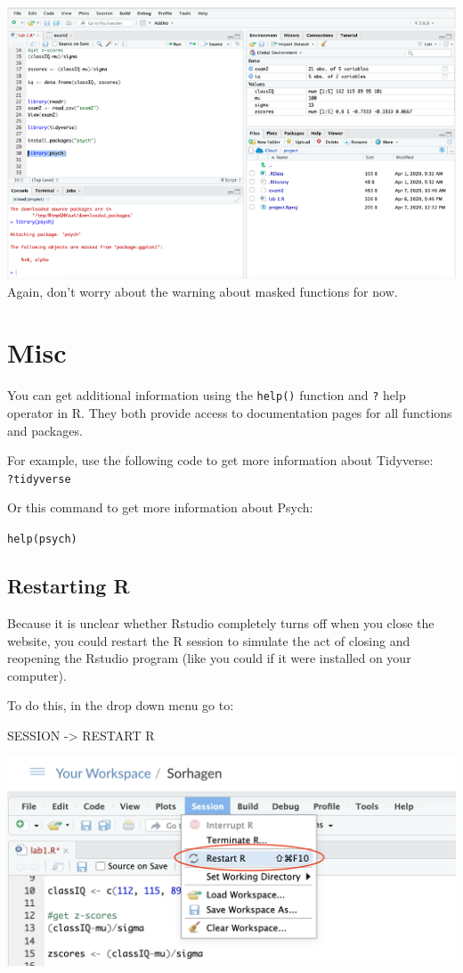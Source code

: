 \documentclass[
]{book}
\begin{document}
\includegraphics{img/loadpsyc.png}
Again, don't worry about the warning about masked functions for now.

\hypertarget{misc}{%
\section{Misc}\label{misc}}

You can get additional information using the \texttt{help()} function and \texttt{?} help operator in R. They both provide access to documentation pages for all functions and packages.

For example, use the following code to get more information about Tidyverse:\\
\texttt{?tidyverse}

Or this command to get more information about Psych:

\texttt{help(psych)}

\hypertarget{restarting-r}{%
\subsection{Restarting R}\label{restarting-r}}

Because it is unclear whether Rstudio completely turns off when you close the website, you could restart the R session to simulate the act of closing and reopening the Rstudio program (like you could if it were installed on your computer).

To do this, in the drop down menu go to:

SESSION -\textgreater{} RESTART R

\includegraphics{img/restart.png}
\end{document}
